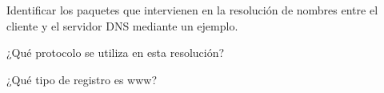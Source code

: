 \documentclass[11pt]{article}
\begin{document}
\begin{question}
\end{question}
\newpage
\begin{question}
    \begin{subquestion}{
        Identificar los paquetes que intervienen en la resolución de nombres entre el cliente y el servidor DNS mediante un ejemplo. 
    }
    \answer{
        \PATO
    }
    \end{subquestion}
    \begin{subquestion}{
       ¿Qué protocolo se utiliza en esta resolución?  
    }
    \end{subquestion}
    
    \begin{subquestion}{
        ¿Qué tipo de registro es www?
    }
\end{subquestion}
\end{question}
\end{document}
